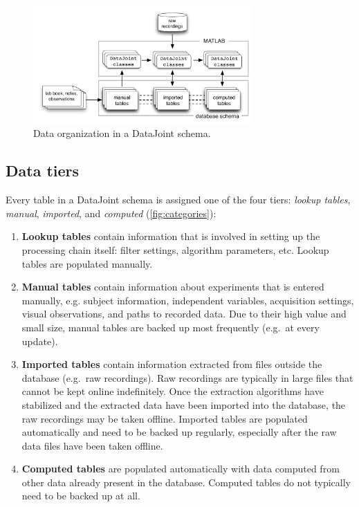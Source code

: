 \documentclass[10pt]{article}
\begin{document}
\begin{figure}[htb]
\center
\includegraphics[width=0.75\textwidth]{categories.pdf}
\caption{Data organization in a DataJoint schema.}
\label{fig:categories}
\end{figure} 
 
\subsection{Data tiers}\label{sec:tiers}
Every table in a DataJoint schema is assigned one of the four tiers: {\em lookup tables}, {\em manual}, {\em imported}, and {\em computed}  (\autoref{fig:categories}):
\begin{enumerate}
   \item{\bf Lookup tables} contain information that is involved in setting up the processing chain itself: filter settings, algorithm parameters, etc.  Lookup tables are populated manually.
   \item{\bf Manual tables} contain information about experiments that is entered manually, e.g. subject information, independent variables, acquisition settings, visual observations, and paths to recorded data.  Due to their high value and small size, manual tables are backed up most frequently (e.g.~at every update).
   \item{\bf Imported tables} contain information extracted from  files outside the database (e.g.~raw recordings).  Raw recordings are typically in large files that cannot be kept online indefinitely. Once the extraction algorithms have stabilized and the extracted  data have been imported into the database, the raw recordings may be taken offline.  Imported tables are populated automatically and need to be backed up regularly, especially after the raw data files have been taken offline. 
   \item {\bf Computed tables} are populated automatically with data computed from other data already present in the database.  Computed tables do not typically need to be backed up at all.
\end{enumerate}  
\end{document}
